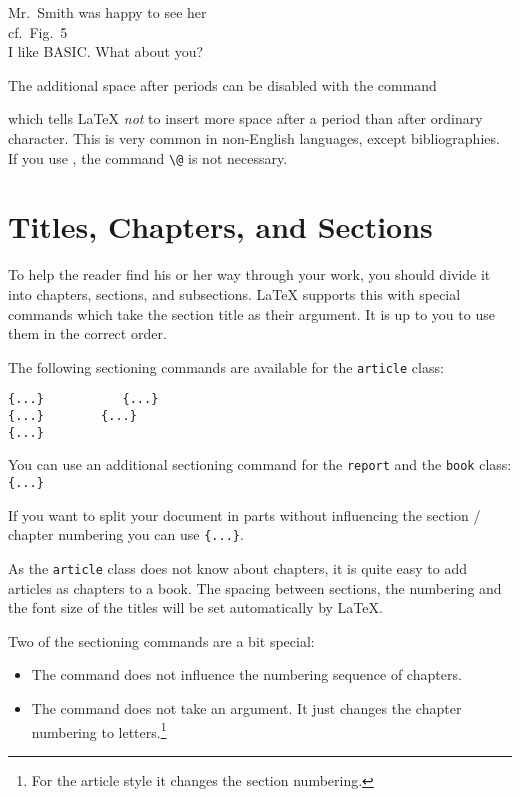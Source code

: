 \begin{example}
Mr.~Smith was happy to see her\\
cf.~Fig.~5\\
I like BASIC\@. What about you?
\end{example}

The additional space after periods can be disabled with the command
\begin{lscommand}
\end{lscommand}
\noindent which tells \LaTeX{} \emph{not} to insert more space after a
period than after ordinary character. This is very common in
non-English languages, except bibliographies. If you use
, the command \verb|\@| is not necessary.
    
\section{Titles, Chapters, and Sections}

To help the reader find his or her way through your work, you should
divide it into chapters, sections, and subsections.  \LaTeX{} supports
this with special commands which take the section title as their
argument.  It is up to you to use them in the correct order.

The following sectioning commands are available for the
\texttt{article} class: \nopagebreak
\begin{code}
\verb|{...}           |\verb|{...}|\\
\verb|{...}        |\verb|{...}|\\
\verb|{...}|
\end{code}

You can use an additional sectioning command for the \texttt{report}
and the \texttt{book} class: \verb|{...}|

If you want to split your document in parts without influencing the section
/ chapter numbering you can use \verb|{...}|.

As the \texttt{article} class does not know about chapters, it is quite easy
to add articles as chapters to a book.
The spacing between sections, the numbering and the font size of the
titles will be set automatically by \LaTeX. 

\pagebreak[3]
Two of the sectioning commands are a bit special: 
\begin{itemize}
\item The  command does
  not influence the numbering sequence of chapters.  
\item The  command does not take an argument. It just
  changes the chapter numbering to letters.\footnote{For the article
    style it changes the section numbering.}
\end{itemize}



